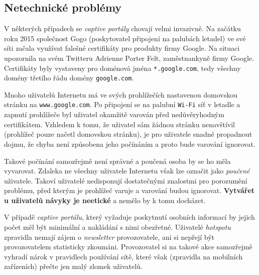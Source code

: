 \documentclass[thesis=M,czech]{FITthesis}[2012/10/20]
\begin{document}
% 





\subsection{Netechnické problémy}
\label{subsec:netechnicke-problemy}

V některých případech se \textit{captive portály} chovají velmi invazivně. Na začátku roku 2015 společnost Gogo (poskytovatel připojení na palubách letadel) ve své síti začala využívat falešné certifikáty pro produkty firmy Google. Na situaci upozornila na svém Twitteru\cite{gogo-fakecerts} Adrienne Porter Felt, zaměstnankyně firmy Google. Certifikáty byly vystaveny pro doménová jména \texttt{*.google.com}, tedy všechny domény třetího řádu domény \texttt{google.com}.

Mnoho uživatelů Internetu má ve svých prohlížečích nastavenou domovskou stránku na \texttt{www.google.com}. Po připojení se na palubní \texttt{Wi-Fi} síť v letadle a zapnutí prohlížeče byl uživatel okamžitě varován před nedůvěryhodným certifikátem. Vzhledem k tomu, že uživatel sám žádnou stránku nenavštívil (prohlížeč pouze načetl domovskou stránku), je pro uživatele snadné propadnout dojmu, že chyba není způsobena jeho počínáním a proto bude varování ignorovat.

Takové počínání samozřejmě není správné a poučená osoba by se ho měla vyvarovat. Zdaleka ne všechny uživatele Internetu však lze označit jako \textit{poučené} uživatele. Takoví uživatelé nedisponují dostatečnými znalostmi pro porozumění problému, před kterým je prohlížeč varuje a varování budou ignorovat. \textbf{Vytvářet u uživatelů návyky  je neetické} a nemělo by k tomu docházet.

V případě \textit{captive portálu}, který vyžaduje poskytnutí osobních informací by jejich počet měl být minimální a nakládání s nimi obezřetné. Uživatelé \textit{hotspotu} zpravidla nemají zájem o \textit{newsletter} provozovatele, ani si nepřejí být provozovatelem statisticky zkoumáni. Provozovatel si na takové akce samozřejmě vyhradí nárok v pravidlech používání sítě, které však (zpravidla na mobilních zařízeních) přečte jen malý zlomek uživatelů.
\end{document}
